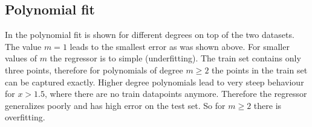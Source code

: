 \documentclass[12pt,a4paper]{scrartcl}
\begin{document}
	\subsection*{Polynomial fit}
	
	In  the polynomial fit is shown for different degrees on top of the two datasets. The value $m=1$ leads to the smallest error as was shown above. 
	For smaller values of $m$ the regressor is to simple (underfitting). The train set contains only three points, therefore for polynomials of degree $m\geq2$ the points in the train set can be captured exactly. Higher degree polynomials lead to very steep behaviour for $x > 1.5$, where there are no train datapoints anymore. Therefore the regressor generalizes poorly and has high error on the test set.
	So for $m \geq 2$ there is overfitting.
	
\end{document}

